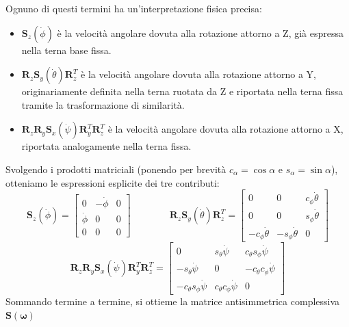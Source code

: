 \documentclass[11pt, a4paper]{report}
\begin{document}
Ognuno di questi termini ha un'interpretazione fisica precisa:
\begin{itemize}
    \item \(\bm{S}_z(\dot{\phi})\) è la velocità angolare dovuta alla rotazione attorno a Z, già espressa nella terna base fissa.
    \item \(\bm{R}_z \bm{S}_y(\dot{\theta}) \bm{R}_z^T\) è la velocità angolare dovuta alla rotazione attorno a Y, originariamente definita nella terna ruotata da Z e riportata nella terna fissa tramite la trasformazione di similarità.
    \item \(\bm{R}_z\bm{R}_y \bm{S}_x(\dot{\psi}) \bm{R}_y^T\bm{R}_z^T\) è la velocità angolare dovuta alla rotazione attorno a X, riportata analogamente nella terna fissa.
\end{itemize}
Svolgendo i prodotti matriciali (ponendo per brevità \(c_\alpha = \cos\alpha\) e \(s_\alpha = \sin\alpha\)), otteniamo le espressioni esplicite dei tre contributi:
\[
    \bm{S}_z(\dot{\phi}) = \begin{bmatrix} 0 & -\dot{\phi} & 0 \\ \dot{\phi} & 0 & 0 \\ 0 & 0 & 0 \end{bmatrix}
    \qquad\qquad
    \bm{R}_z \bm{S}_y(\dot{\theta}) \bm{R}_z^T = \begin{bmatrix} 0 & 0 & c_{\phi}\dot{\theta} \\ 0 & 0 & s_{\phi}\dot{\theta} \\ -c_{\phi}\dot{\theta} & -s_{\phi}\dot{\theta} & 0 \end{bmatrix}
\]
\[
    \bm{R}_z\bm{R}_y \bm{S}_x(\dot{\psi}) \bm{R}_y^T\bm{R}_z^T = \begin{bmatrix} 0 & s_{\theta}\dot{\psi} & c_{\theta}s_{\phi}\dot{\psi} \\ -s_{\theta}\dot{\psi} & 0 & -c_{\theta}c_{\phi}\dot{\psi} \\ -c_{\theta}s_{\phi}\dot{\psi} & c_{\theta}c_{\phi}\dot{\psi} & 0 \end{bmatrix}
\]
Sommando termine a termine, si ottieme la matrice antisimmetrica complessiva \(\bm{S}(\bm{\omega})\)

\end{document}
